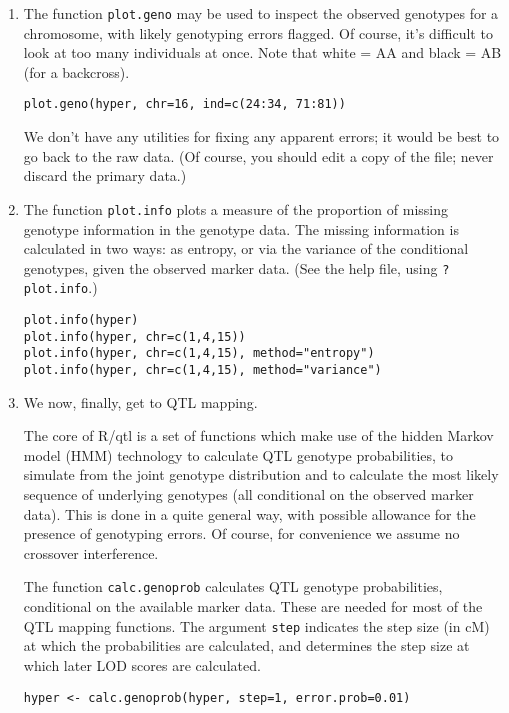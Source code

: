 \documentclass[10pt,letterpaper]{article}
\newcommand{\usercolor}{\color [named]{BlueViolet}}
\begin{document}
\begin{enumerate}
\item The function \verb-plot.geno- may be used to inspect the
observed genotypes for a chromosome, with likely genotyping errors
flagged.  Of course, it's difficult to look at too many individuals at
once.  Note that white = AA and black = AB (for a backcross).  

\usercolor
\verb|plot.geno(hyper, chr=16, ind=c(24:34, 71:81))|
\normalcolor

We don't have any utilities for fixing any apparent errors; it would
be best to go back to the raw data.  (Of course, you should edit a
copy of the file; never discard the primary data.)

\item The function \verb-plot.info- plots a measure of the proportion
of missing genotype information in the genotype data.  The missing
information is calculated in two ways: as entropy, or via the
variance of the conditional genotypes, given the observed marker
data.  (See the help file, using \verb-?plot.info-.)  

\usercolor
\verb|plot.info(hyper)| \\
\verb|plot.info(hyper, chr=c(1,4,15))| \\
\verb|plot.info(hyper, chr=c(1,4,15), method="entropy")| \\
\verb|plot.info(hyper, chr=c(1,4,15), method="variance")| 
\normalcolor


\item We now, finally, get to QTL mapping.  

The core of R/qtl is a set of functions which make use of the hidden
Markov model (HMM) technology to calculate QTL genotype probabilities,
to simulate from the joint genotype distribution and to calculate the
most likely sequence of underlying genotypes (all conditional on the
observed marker data).  This is done in a quite general way, with
possible allowance for the presence of genotyping errors.  Of course, 
for convenience we assume no crossover interference.  

The function \verb-calc.genoprob- calculates QTL genotype
probabilities, conditional on the available marker data. These are
needed for most of the QTL mapping functions.  The argument
\verb-step- indicates the step size (in cM) at which the probabilities
are calculated, and determines the step size at which later LOD scores
are calculated.

\usercolor
\verb|hyper <- calc.genoprob(hyper, step=1, error.prob=0.01)| \normalcolor


\end{enumerate}
\end{document}
